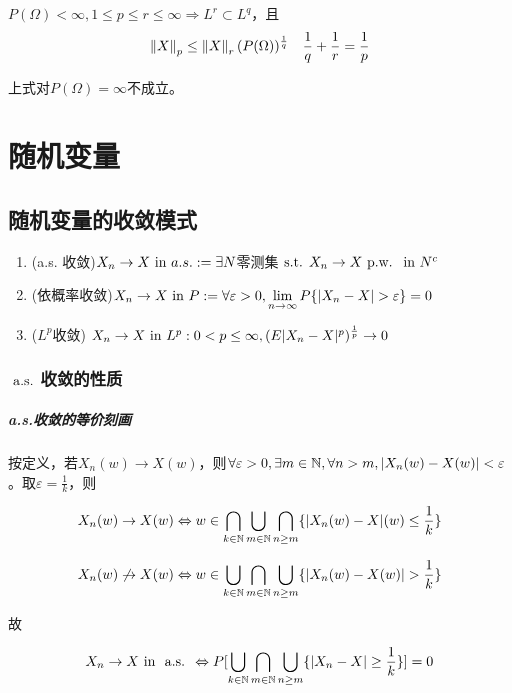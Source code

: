 \documentclass{ctexbook}
\begin{document}
\begin{Eg}
  $P(\Omega)<\infty, 1\leq p\leq r\leq \infty\Rightarrow L^{r}\subset L^{q}$，且
  \[\left\|X\right\|_{p}\leq \left\|X\right\|_{r}(P(\Omega))^{\frac{1}{q}}\quad \frac{1}{q}+\frac{1}{r}=\frac{1}{p}\]
\end{Eg}

\begin{Rmk}
  上式对$P(\Omega)=\infty$不成立。
\end{Rmk}

\chapter{随机变量}

\section{随机变量的收敛模式}
\begin{Def}
  \begin{enumerate}
  \item (a.s. 收敛)$X_{n}\to X\text{ in } a.s.:=\exists N$零测集$\text{ s.t. } X_{n}\to X \text{ p.w. }\text{ in } N^{c}$
  \item (依概率收敛)$X_{n}\to X\cvin P:= \forall\varepsilon>0,\lim\limits_{n\to\infty}P\{|X_{n}-X|>\varepsilon\}=0$
  \item ($L^{p}$收敛) $X_{n}\to X\text{ in } L^{p}:0<p\leq \infty, (E|X_{n}-X|^{p})^{\frac 1 p}\to 0 $
  \end{enumerate}
\end{Def}

\subsection{$\text{ a.s. }$收敛的性质}
\paragraph{a.s.收敛的等价刻画}
按定义，若$X_{n}(w)\to X(w)$，则$\forall\varepsilon>0,\exists m\in\mathbb{N},\forall n>m, |X_{n}(w)-X(w)|<\varepsilon$。取$\varepsilon=\frac{1}{k}$，则

\[X_{n}(w)\to X(w)\Leftrightarrow w\in\bigcap_{k\in \mathbb{N}}\bigcup_{m\in\mathbb{N}}\bigcap_{n\geq m}\{|X_{n}(w)-X|(w)\leq\frac{1}{k}\}\]

\[X_{n}(w)\not\to X(w)\Leftrightarrow w\in\bigcup_{k\in \N}\bigcap_{m\in\N}\bigcup_{n\geq m}\{|X_{n}(w)-X(w)|>\frac{1}{k}\}\]

故

\[X_{n}\to X\text{ in } \text{ a.s. }\Leftrightarrow P[\bigcup_{k\in\mathbb{N}}\bigcap_{m\in\mathbb{N}}\bigcup_{n\geq m}\{|X_{n}-X|\geq\frac{1}{k}\}]=0\]
\end{document}
